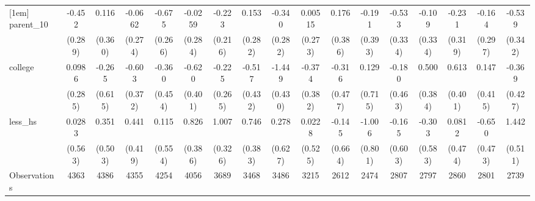 {\begin{tabular}{l*{16}{c}}
[1em]
parent\_10           &      -0.452         &       0.116         &     -0.0662         &      -0.675\sym{*}  &     -0.0259         &      -0.223         &       0.153         &      -0.340         &     0.00515         &       0.176         &      -0.191         &      -0.533         &      -0.109         &      -0.231         &      -0.164         &      -0.539         \\
                    &     (0.289)         &     (0.360)         &     (0.274)         &     (0.266)         &     (0.284)         &     (0.216)         &     (0.282)         &     (0.282)         &     (0.273)         &     (0.386)         &     (0.393)         &     (0.334)         &     (0.334)         &     (0.319)         &     (0.297)         &     (0.342)         \\
[1em]
college             &      0.0986         &      -0.265         &      -0.603         &      -0.360         &      -0.620         &      -0.225         &      -0.517         &      -1.449\sym{***}&      -0.374         &      -0.316         &       0.129         &      -0.180         &       0.500         &       0.613         &       0.147         &      -0.369         \\
                    &     (0.285)         &     (0.615)         &     (0.372)         &     (0.454)         &     (0.401)         &     (0.265)         &     (0.432)         &     (0.430)         &     (0.382)         &     (0.477)         &     (0.715)         &     (0.463)         &     (0.384)         &     (0.401)         &     (0.415)         &     (0.427)         \\
[1em]
less\_hs             &      0.0283         &       0.351         &       0.441         &       0.115         &       0.826\sym{*}  &       1.007\sym{**} &       0.746         &       0.278         &      0.0228         &      -0.145         &      -1.006         &      -0.165         &      -0.303         &      0.0812         &      -0.650         &       1.442\sym{**} \\
                    &     (0.563)         &     (0.503)         &     (0.419)         &     (0.554)         &     (0.386)         &     (0.326)         &     (0.383)         &     (0.627)         &     (0.525)         &     (0.664)         &     (0.801)         &     (0.603)         &     (0.583)         &     (0.474)         &     (0.473)         &     (0.511)         \\
\hline
Observations        &        4363         &        4386         &        4355         &        4254         &        4056         &        3689         &        3468         &        3486         &        3215         &        2612         &        2474         &        2807         &        2797         &        2860         &        2801         &        2739         \\

\end{tabular}}
